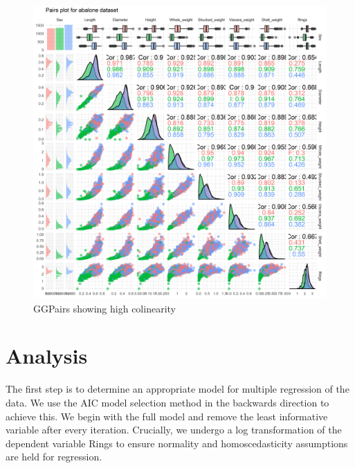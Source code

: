 \documentclass[10pt,twocolumn]{article}
\begin{document}
		\begin{figure}[!htbp]
			\centering
			\includegraphics[width=\columnwidth]{ggpairs}
			\caption{GGPairs showing high colinearity}
			\label{fig:ggpairs}
		\end{figure}
		
		
	\section{Analysis}
	The first step is to determine an appropriate model for multiple regression of the data. We use the AIC model selection method in the backwards direction to achieve this. We begin with the full model and remove the least informative variable after every iteration. Crucially, we undergo a log transformation of the dependent variable Rings to ensure normality and homoscedasticity assumptions are held for regression. 
	
	\begin{table}[!htbp]
		\centering
			\caption{Stepback AIC coefficients}
		\label{my-label}
	\end{table}	
	
\end{document}
